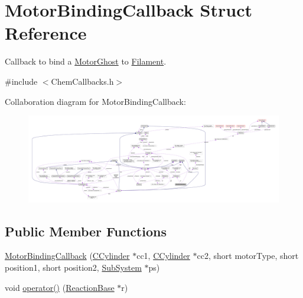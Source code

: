 \hypertarget{structMotorBindingCallback}{\section{Motor\+Binding\+Callback Struct Reference}
\label{structMotorBindingCallback}
}


Callback to bind a \hyperlink{classMotorGhost}{Motor\+Ghost} to \hyperlink{classFilament}{Filament}.  




{\ttfamily \#include $<$Chem\+Callbacks.\+h$>$}



Collaboration diagram for Motor\+Binding\+Callback\+:
\nopagebreak
\begin{figure}[H]
\begin{center}
\leavevmode
\includegraphics[width=350pt]{structMotorBindingCallback__coll__graph}
\end{center}
\end{figure}
\subsection*{Public Member Functions}
\begin{DoxyCompactItemize}
\item 
\hyperlink{structMotorBindingCallback_a063a3eb832d1ac51e14261ce3af5aabe}{Motor\+Binding\+Callback} (\hyperlink{classCCylinder}{C\+Cylinder} $\ast$cc1, \hyperlink{classCCylinder}{C\+Cylinder} $\ast$cc2, short motor\+Type, short position1, short position2, \hyperlink{classSubSystem}{Sub\+System} $\ast$ps)
\item 
void \hyperlink{structMotorBindingCallback_a91333b9e848e1b77134cb20543d9c4b3}{operator()} (\hyperlink{classReactionBase}{Reaction\+Base} $\ast$r)
\end{DoxyCompactItemize}
